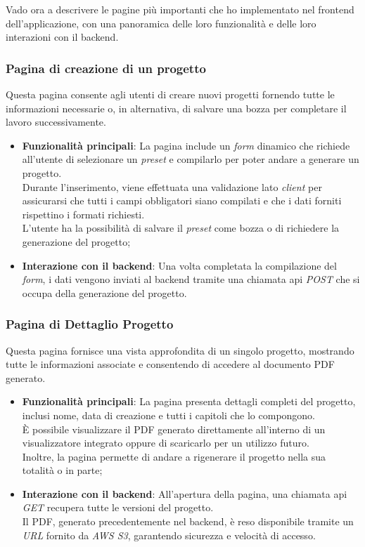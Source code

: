 \noindent Vado ora a descrivere le pagine più importanti che ho implementato nel \gls{frontend} dell'applicazione, con una panoramica delle loro funzionalità e delle loro interazioni con il \gls{backend}.

\subsubsection{Pagina di creazione di un progetto}
Questa pagina consente agli utenti di creare nuovi progetti fornendo tutte le informazioni necessarie o, in alternativa, di salvare una bozza per completare il lavoro successivamente. 
\begin{itemize}
    \item \textbf{Funzionalità principali}: La pagina include un \textit{form} dinamico che richiede all'utente di selezionare un \textit{preset} e compilarlo per poter andare a generare un progetto.\\ 
    Durante l'inserimento, viene effettuata una validazione lato \textit{client} per assicurarsi che tutti i campi obbligatori siano compilati e che i dati forniti rispettino i formati richiesti. \\
    L'utente ha la possibilità di salvare il \textit{preset} come bozza o di richiedere la generazione del progetto;
    \item \textbf{Interazione con il \gls{backend}}: Una volta completata la compilazione del \textit{form}, i dati vengono inviati al \gls{backend} tramite una chiamata \gls{api} \textit{POST} che si occupa della generazione del progetto.\\
\end{itemize}

\subsubsection{Pagina di Dettaglio Progetto}
Questa pagina fornisce una vista approfondita di un singolo progetto, mostrando tutte le informazioni associate e consentendo di accedere al documento PDF generato.
\begin{itemize}
    \item \textbf{Funzionalità principali}: La pagina presenta dettagli completi del progetto, inclusi nome, data di creazione e tutti i capitoli che lo compongono.\\
    È possibile visualizzare il PDF generato direttamente all'interno di un visualizzatore integrato oppure di scaricarlo per un utilizzo futuro.\\
    Inoltre, la pagina permette di andare a rigenerare il progetto nella sua totalità o in parte;
    \item \textbf{Interazione con il \gls{backend}}: All'apertura della pagina, una chiamata \gls{api} \textit{GET} recupera tutte le versioni del progetto.\\
    Il PDF, generato precedentemente nel \gls{backend}, è reso disponibile tramite un \textit{URL} fornito da \textit{AWS S3}, garantendo sicurezza e velocità di accesso. 
\end{itemize}

